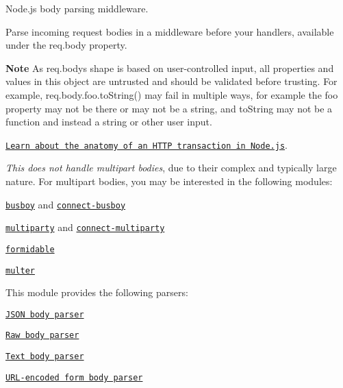 \href{https://npmjs.org/package/body-parser}{\tt } \href{https://npmjs.org/package/body-parser}{\tt } \href{https://travis-ci.org/expressjs/body-parser}{\tt } \href{https://coveralls.io/r/expressjs/body-parser?branch=master}{\tt }

Node.\+js body parsing middleware.

Parse incoming request bodies in a middleware before your handlers, available under the {\ttfamily req.\+body} property.

{\bfseries Note} As {\ttfamily req.\+body}\textquotesingle{}s shape is based on user-\/controlled input, all properties and values in this object are untrusted and should be validated before trusting. For example, {\ttfamily req.\+body.\+foo.\+to\+String()} may fail in multiple ways, for example the {\ttfamily foo} property may not be there or may not be a string, and {\ttfamily to\+String} may not be a function and instead a string or other user input.

\href{https://nodejs.org/en/docs/guides/anatomy-of-an-http-transaction/}{\tt Learn about the anatomy of an H\+T\+TP transaction in Node.\+js}.

{\itshape This does not handle multipart bodies}, due to their complex and typically large nature. For multipart bodies, you may be interested in the following modules\+:


\begin{DoxyItemize}
\item \href{https://www.npmjs.org/package/busboy#readme}{\tt busboy} and \href{https://www.npmjs.org/package/connect-busboy#readme}{\tt connect-\/busboy}
\item \href{https://www.npmjs.org/package/multiparty#readme}{\tt multiparty} and \href{https://www.npmjs.org/package/connect-multiparty#readme}{\tt connect-\/multiparty}
\item \href{https://www.npmjs.org/package/formidable#readme}{\tt formidable}
\item \href{https://www.npmjs.org/package/multer#readme}{\tt multer}
\end{DoxyItemize}

This module provides the following parsers\+:


\begin{DoxyItemize}
\item \href{#bodyparserjsonoptions}{\tt J\+S\+ON body parser}
\item \href{#bodyparserrawoptions}{\tt Raw body parser}
\item \href{#bodyparsertextoptions}{\tt Text body parser}
\item \href{#bodyparserurlencodedoptions}{\tt U\+R\+L-\/encoded form body parser}
\end{DoxyItemize}

